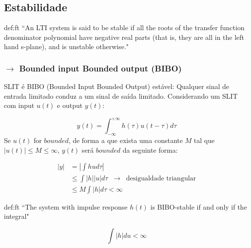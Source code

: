\subsection[2.2 Estabilidade]{\hspace*{0.075 em}\raisebox{0.2 em}{$\pmb{\drsh}$} Estabilidade}
\label{sec:stability}

\begin{theo}{def:ft}\label{def:stability}
    \noindent ``An LTI system is said to be stable if all the roots of the transfer function denominator polynomial have negative real parts (that is, they are all in the left hand s-plane), and is unstable otherwise."\cite{FranklinPowell2015}
\end{theo}

\subsubsection[2.2.1 Bounded input Bounded output (BIBO)]{$\pmb{\rightarrow}$ Bounded input Bounded output (BIBO)}

\noindent SLIT é BIBO (Bounded Input Bounded Output) estável: Qualquer sinal de entrada limitado conduz a um sinal de saída limitado. Considerando um SLIT com input $u(t)$ e output $y(t)$:

$$
    y(t) = \int_{-\infty}^{+\infty} h(\tau)u(t - \tau)d\tau
$$
\noindent Se $u(t)$ for $bounded$, de forma a que exista uma constante $M$ tal que $|u(t)| \leq M \leq \infty$, $y(t)$ será $bounded$ da seguinte forma:

$$
    \begin{aligned}
        |y| &= \left|\int h u d\tau\right|\\
        &\leq \int |h| |u| d\tau\;\; \rightarrow\;\; \text{desigualdade triangular}\\
        &\leq M\int |h|d\tau < \infty
    \end{aligned}
$$

\begin{theo}{def:ft}\label{def:stability_BIBO}
    \noindent ``The system with impulse response $h(t)$ is BIBO-stable
if and only if the integral"\cite{FranklinPowell2015}

    $$
        \int |h|du < \infty
    $$
\end{theo}

